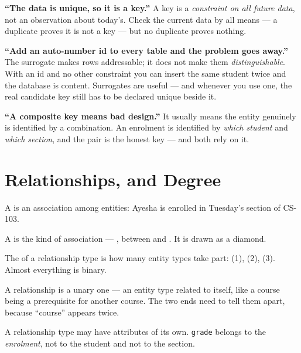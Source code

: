 \begin{alertbox}
\begin{tight}
  \item \textbf{``The data is unique, so it is a key.''} A key is a
        \emph{constraint on all future data}, not an observation about today's.
        Check the current data by all means --- a duplicate proves it is not a
        key --- but no duplicate proves nothing.
  \item \textbf{``Add an auto-number id to every table and the problem goes
        away.''} The surrogate makes rows addressable; it does not make them
        \emph{distinguishable}. With an id and no other constraint you can
        insert the same student twice and the database is content. Surrogates
        are useful --- and whenever you use one, the real candidate key still
        has to be declared unique beside it.
  \item \textbf{``A composite key means bad design.''} It usually means the
        entity genuinely is identified by a combination. An enrolment is
        identified by \emph{which student} and \emph{which section}, and the
        pair is the honest key ---  and 
        both rely on it.
\end{tight}
\end{alertbox}

\section{Relationships, and Degree}

\begin{definitionbox}
A  is an association among entities: Ayesha is enrolled in
Tuesday's section of CS-103.

\smallskip
A  is the kind of association --- ,
between  and . It is drawn as a diamond.

\smallskip
The  of a relationship type is how many entity types take part:
 (1),  (2),  (3). Almost everything is
binary.

\smallskip
A  relationship is a unary one --- an entity type related to
itself, like a course being a prerequisite for another course. The two ends
need  to tell them apart, because ``course'' appears twice.

\smallskip
A relationship type may have attributes of its own. \texttt{grade} belongs to
the \emph{enrolment}, not to the student and not to the section.
\end{definitionbox}

